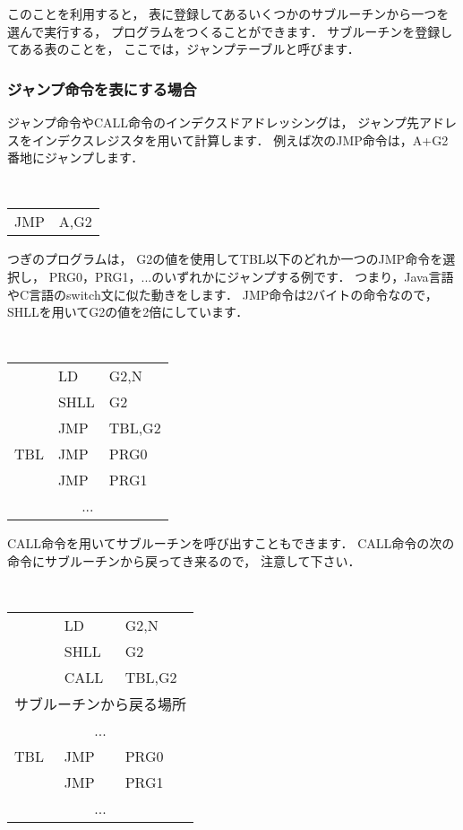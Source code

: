 このことを利用すると，
表に登録してあるいくつかのサブルーチンから一つを選んで実行する，
プログラムをつくることができます．
サブルーチンを登録してある表のことを，
ここでは，ジャンプテーブルと呼びます．

\subsubsection{ジャンプ命令を表にする場合}
ジャンプ命令やCALL命令のインデクスドアドレッシングは，
ジャンプ先アドレスをインデクスレジスタを用いて計算します．
例えば次のJMP命令は，A+G2番地にジャンプします．

\begin{center}
{\small\tt
\begin{tabular}{l l}
JMP & A,G2   \\
\end{tabular}
}
\end{center}

つぎのプログラムは，
G2の値を使用してTBL以下のどれか一つのJMP命令を選択し，
PRG0，PRG1，...のいずれかにジャンプする例です．
つまり，Java言語やC言語のswitch文に似た動きをします．
JMP命令は2バイトの命令なので，
SHLLを用いてG2の値を2倍にしています．

\begin{center}
{\small\tt
\begin{tabular}{l l l}
    & LD    & G2,N   \\
    & SHLL  & G2     \\
    & JMP   & TBL,G2 \\
TBL & JMP   & PRG0   \\
    & JMP   & PRG1   \\
\multicolumn{3}{c}{...} \\
\end{tabular}
}
\end{center}

CALL命令を用いてサブルーチンを呼び出すこともできます．
CALL命令の次の命令にサブルーチンから戻ってき来るので，
注意して下さい．

\begin{center}
{\small\tt
\begin{tabular}{l l l}
    & LD    & G2,N   \\
    & SHLL  & G2     \\
    & CALL  & TBL,G2 \\
\multicolumn{3}{c}{サブルーチンから戻る場所} \\
\multicolumn{3}{c}{...} \\
TBL & JMP   & PRG0   \\
    & JMP   & PRG1   \\
\multicolumn{3}{c}{...} \\
\end{tabular}
}
\end{center}

